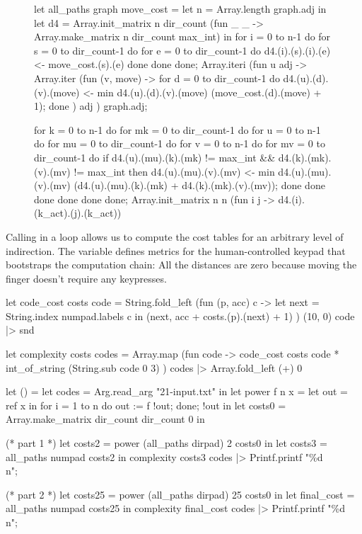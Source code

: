 \documentclass{article}
\begin{document}
\begin{figure}
\begin{code}[ocaml]
let all_paths graph move_cost = 
  let n = Array.length graph.adj in
  let d4 = Array.init_matrix n dir_count (fun _ _ -> Array.make_matrix n dir_count max_int) in
  for i = 0 to n-1 do
    for s = 0 to dir_count-1 do
      for e = 0 to dir_count-1 do
        d4.(i).(s).(i).(e) <- move_cost.(s).(e)
      done
    done
  done;
  Array.iteri (fun u adj ->
      Array.iter (fun (v, move) ->
          for d = 0 to dir_count-1 do
            d4.(u).(d).(v).(move) <- min d4.(u).(d).(v).(move) (move_cost.(d).(move) + 1);
          done
        ) adj
    ) graph.adj;

  for k = 0 to n-1 do
    for mk = 0 to dir_count-1 do
      for u = 0 to n-1 do
        for mu = 0 to dir_count-1 do
          for v = 0 to n-1 do
            for mv = 0 to dir_count-1 do
              if d4.(u).(mu).(k).(mk) != max_int && d4.(k).(mk).(v).(mv) != max_int then
                d4.(u).(mu).(v).(mv) <-
                  min d4.(u).(mu).(v).(mv)
                    (d4.(u).(mu).(k).(mk) + d4.(k).(mk).(v).(mv));
            done
          done
        done
      done
    done
  done;
  Array.init_matrix n n (fun i j -> d4.(i).(k_act).(j).(k_act))
\end{code}
\end{figure}

Calling  in a loop allows us to compute the cost tables for an arbitrary level of indirection.
The  variable defines metrics for the human-controlled keypad that bootstraps the computation chain:
All the distances are zero because moving the finger doesn't require any keypresses.

\begin{code}[ocaml]
let code_cost costs code =
  String.fold_left (fun (p, acc) c ->
      let next = String.index numpad.labels c in
      (next, acc + costs.(p).(next) + 1)
    ) (10, 0) code |> snd

let complexity costs codes =
  Array.map (fun code ->
      code_cost costs code * int_of_string (String.sub code 0 3)
    ) codes
  |> Array.fold_left (+) 0 

let () =
  let codes = Arg.read_arg "21-input.txt" in
  let power f n x = let out = ref x in for i = 1 to n do out := f !out; done; !out in
  let costs0 = Array.make_matrix dir_count dir_count 0 in

  (* part 1 *)
  let costs2 = power (all_paths dirpad) 2 costs0 in
  let costs3 = all_paths numpad costs2 in
  complexity costs3 codes |> Printf.printf "\%d\\n";

  (* part 2 *)  
  let costs25 = power (all_paths dirpad) 25 costs0 in
  let final_cost = all_paths numpad costs25 in
  complexity final_cost codes |> Printf.printf "\%d\\n";
\end{code}
\end{document}
